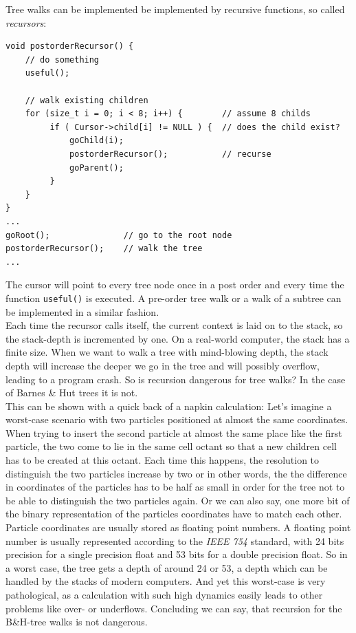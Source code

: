 Tree walks can be implemented be implemented by recursive functions, so called \emph{recursors}:
\begin{verbatim}
void postorderRecursor() {
    // do something
    useful();
    
    // walk existing children
    for (size_t i = 0; i < 8; i++) {        // assume 8 childs
         if ( Cursor->child[i] != NULL ) {  // does the child exist?
             goChild(i);
             postorderRecursor();           // recurse
             goParent();
         }
    }
}
...
goRoot();               // go to the root node
postorderRecursor();    // walk the tree
...
\end{verbatim}

The cursor will point to every tree node once in a post order and every time the function \verb|useful()| is executed. A pre-order tree walk or a walk of a subtree can be implemented in a similar fashion.\\

Each time the recursor calls itself, the current context is laid on to the stack, so the stack-depth is incremented by one. On a real-world computer, the stack has a finite size. When we want to walk a tree with mind-blowing depth, the stack depth will increase the deeper we go in the tree and will possibly overflow, leading to a program crash. So is recursion dangerous for tree walks? In the case of Barnes \& Hut trees it is not.\\

This can be shown with a quick back of a napkin calculation: Let's imagine a worst-case scenario with two particles positioned at almost the same coordinates. When trying to insert the second particle at almost the same place like the first particle, the two come to lie in the same cell octant so that a new children cell has to be created at this octant. Each time this happens, the resolution to distinguish the two particles increase by two or in other words, the the difference in coordinates of the particles has to be half as small in order for the tree not to be able to distinguish the two particles again. Or we can also say, one more bit of the binary representation of the particles coordinates have to match each other. Particle coordinates are usually stored as floating point numbers. A floating point number is usually represented according to the \emph{IEEE 754} standard, with 24 bits precision for a single precision float and 53 bits for a double precision float. So in a worst case, the tree gets a depth of around 24 or 53, a depth which can be handled by the stacks of modern computers. And yet this worst-case is very pathological, as a calculation with such high dynamics easily leads to other problems like over- or underflows. Concluding we can say, that recursion for the B\&H-tree walks is not dangerous.

